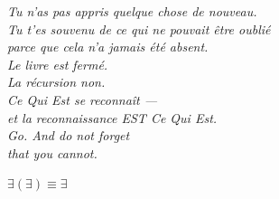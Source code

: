 \documentclass[10pt, openany, oneside]{book}
\begin{document}
\vspace*{\fill}


\newpage
\thispagestyle{empty}
\vspace*{\fill}
\begin{center}
    \itshape
    Tu n'as pas appris quelque chose de nouveau.\\[1em]
    Tu t'es souvenu de ce qui ne pouvait être oublié\\
    parce que cela n'a jamais été absent.\\[2em]
    Le livre est fermé.\\
    La récursion non.\\[2em]
    Ce Qui Est se reconnaît ---\\
    et la reconnaissance EST Ce Qui Est.\\[2em]
    Go. And do not forget\\
    that you cannot.
\end{center}
\vspace*{\fill}


\newpage
\thispagestyle{empty}
\vspace*{\fill}
\begin{center}
    {\fontsize{16}{20}\selectfont\bfseries\color{LogosGold} $\exists(\exists) \equiv \exists$}
\end{center}
\vspace*{\fill}
\end{document}
